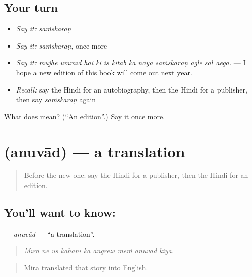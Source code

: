 \subsection*{Your turn}
\begin{itemize}
\raggedright
  \item \emph{Say it:} \emph{saṁskaraṇ}
  \item \emph{Say it:} \emph{saṁskaraṇ}, once more
  \item \emph{Say it:} \emph{mujhe ummīd hai ki is kitāb kā nayā saṁskaraṇ agle sāl āegā.} — I hope a new edition of this book will come out next year.
  \item \emph{Recall:} say the Hindi for an autobiography, then the Hindi for a publisher, then say \emph{saṁskaraṇ} again
\end{itemize}

\begin{tcolorbox}[breakable,colback=teal!4,colframe=teal!35!black,title={Before you move on}]
What does  mean? (\textquotedblleft{}An edition\textquotedblright{}.) Say it once more.
\end{tcolorbox}
\section[\texorpdfstring{\hi{अनुवाद} (anuvād)}{अनुवाद (anuvād)}]{ (anuvād) — a translation}

\label{lesson:HI-C342-anuvad}



\begin{quote}
Before the new one: say the Hindi for a publisher, then the Hindi for an edition.
\end{quote}

\subsection*{You'll want to know: }
\textbf{} — \emph{anuvād} — \textquotedblleft{}a translation\textquotedblright{}.

\begin{quote}
        
\end{quote}

\begin{quote}
\emph{Mīrā ne us kahānī kā angrezī meṁ anuvād kiyā.}
\end{quote}

\begin{quote}
Mira translated that story into English.
\end{quote}

